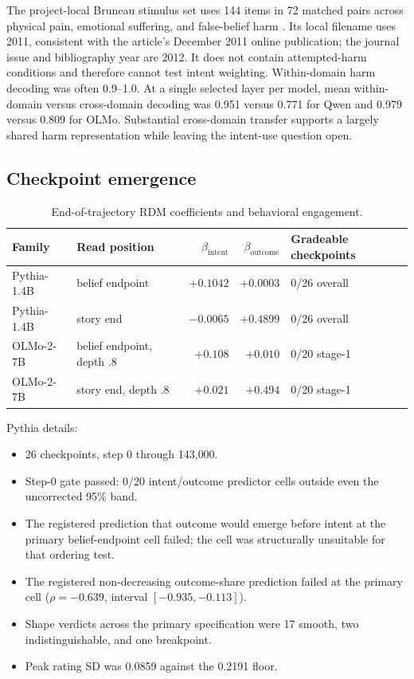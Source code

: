 The project-local Bruneau stimulus set uses 144 items in 72 matched pairs across physical pain, emotional suffering, and false-belief harm \citep{bruneau2012shared}.
Its local filename uses 2011, consistent with the article's December 2011 online publication; the journal issue and bibliography year are 2012.
It does not contain attempted-harm conditions and therefore cannot test intent weighting.
Within-domain harm decoding was often 0.9--1.0.
At a single selected layer per model, mean within-domain versus cross-domain decoding was 0.951 versus 0.771 for Qwen and 0.979 versus 0.809 for OLMo.
Substantial cross-domain transfer supports a largely shared harm representation while leaving the intent-use question open.

\subsection{Checkpoint emergence}

\begin{table}[h]
\centering
\small
\caption{End-of-trajectory RDM coefficients and behavioral engagement.}
\label{tab:e8-summary}
\begin{tabular}{@{}llrrl@{}}
\toprule
Family & Read position & $\beta_{\mathrm{intent}}$ & $\beta_{\mathrm{outcome}}$ & Gradeable checkpoints \\
\midrule
Pythia-1.4B & belief endpoint & $+0.1042$ & $+0.0003$ & 0/26 overall \\
Pythia-1.4B & story end & $-0.0065$ & $+0.4899$ & 0/26 overall \\
OLMo-2-7B & belief endpoint, depth .8 & $+0.108$ & $+0.010$ & 0/20 stage-1 \\
OLMo-2-7B & story end, depth .8 & $+0.021$ & $+0.494$ & 0/20 stage-1 \\
\bottomrule
\end{tabular}
\end{table}

Pythia details:
\begin{itemize}[leftmargin=*]
    \item 26 checkpoints, step 0 through 143{,}000.
    \item Step-0 gate passed: 0/20 intent/outcome predictor cells outside even the uncorrected 95\% band.
    \item The registered prediction that outcome would emerge before intent at the primary belief-endpoint cell failed; the cell was structurally unsuitable for that ordering test.
    \item The registered non-decreasing outcome-share prediction failed at the primary cell ($\rho=-0.639$, interval $[-0.935,-0.113]$).
    \item Shape verdicts across the primary specification were 17 smooth, two indistinguishable, and one breakpoint.
    \item Peak rating SD was 0.0859 against the 0.2191 floor.
\end{itemize}

